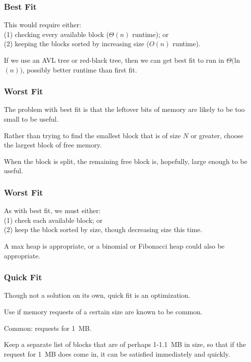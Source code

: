 \begin{frame}
\frametitle{Best Fit}

This would require either:\\
\quad (1) checking every available block ($\Theta(n)$ runtime); or\\
\quad (2) keeping the blocks sorted by increasing size ($O(n)$ runtime). 

If we use an AVL tree or red-black tree, then we can get best fit to run in $\Theta($ln$(n))$, possibly better runtime than first fit.

\end{frame}

\begin{frame}
\frametitle{Worst Fit}

The problem with best fit is that the leftover bits of memory are likely to be too small to be useful. 

Rather than trying to find the smallest block that is of size $N$ or greater, choose the largest block of free memory. 

When the block is split, the remaining free block is, hopefully, large enough to be useful. 



\end{frame}

\begin{frame}
\frametitle{Worst Fit}

As with best fit, we must either:\\
\quad (1) check each available block; or \\
\quad (2) keep the block sorted by size, though decreasing size this time. 

A max heap is appropriate, or a binomial or Fibonacci heap could also be appropriate.

\end{frame}

\begin{frame}
\frametitle{Quick Fit}

Though not a solution on its own, quick fit is an optimization. 

Use if memory requests of a certain size are known to be common. 

Common: requests for 1~MB.

Keep a separate list of blocks that are of perhaps 1-1.1~MB in size, so that if the request for 1~MB does come in, it can be satisfied immediately and quickly. 

\end{frame}

